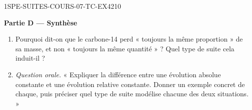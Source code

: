 \begin{exercice}{1SPE-SUITES-COURS-07-TC-EX4}{2}{10}

\textbf{Partie D — Synthèse}

\begin{enumerate}
  \item Pourquoi dit-on que le carbone-14 perd « toujours la même proportion » de sa masse, et non « toujours la même quantité » ? Quel type de suite cela induit-il ?
  \item \pictoOral{} \textit{Question orale.} « Expliquer la différence entre une évolution absolue constante et une évolution relative constante. Donner un exemple concret de chaque, puis préciser quel type de suite modélise chacune des deux situations. »
\end{enumerate}

\end{exercice}

